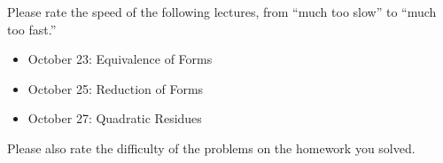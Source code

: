 \documentclass[../notes.tex]{subfiles}
\begin{document}
\begin{prob}[0 points]
	Please rate the speed of the following lectures, from ``much too slow'' to ``much too fast.''
	\begin{itemize}
		\item October 23: Equivalence of Forms
		\item October 25: Reduction of Forms
		\item October 27: Quadratic Residues
	\end{itemize}
	Please also rate the difficulty of the problems on the homework you solved.
\end{prob}
\end{document}
